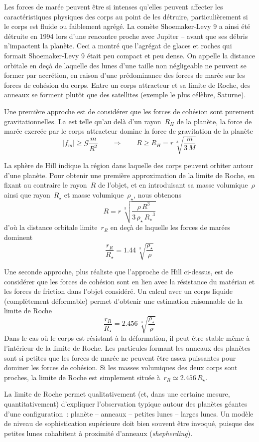 \sk
Les forces de marée peuvent être si intenses qu'elles peuvent affecter les caractéristiques physiques des corps au point de les détruire, particulièrement si le corps est fluide ou faiblement agrégé. La comète Shoemaker-Levy 9 a ainsi été détruite en 1994 lors d'une rencontre proche avec Jupiter -- avant que ses débris n'impactent la planète. Ceci a montré que l'agrégat de glaces et roches qui formait Shoemaker-Levy 9 était peu compact et peu dense. On appelle  la distance orbitale en deçà de laquelle des lunes d'une taille non négligeable ne peuvent se former par accrétion, en raison d'une prédominance des forces de marée sur les forces de cohésion du corps. Entre un corps attracteur et sa limite de Roche, des anneaux se forment plutôt que des satellites (exemple le plus célèbre, Saturne).

\sk
Une première approche est de considérer que les forces de cohésion sont purement gravitationnelles. La  est telle qu'au delà d'un rayon~$R_H$ de la planète, la force de marée exercée par le corps attracteur domine la force de gravitation de la planète
\[ |f_m| \geq \mathcal{G} \frac{m}{R^2} \qquad \Rightarrow \qquad R \geq R_H = r \, \sqrt[3]{ \frac{m}{3\,M} } \]

\sk
La sphère de Hill indique la région dans laquelle des corps peuvent orbiter autour d'une planète. Pour obtenir une première approximation de la limite de Roche, en fixant au contraire le rayon~$R$ de l'objet, et en introduisant sa masse volumique~$\rho$ ainsi que rayon~$R_{\star}$ et masse volumique~$\rho_{\star}$, nous obtenons
\[ R = r \, \sqrt[3]{ \frac{\rho \, R^3}{3\, \rho_{\star} \, {R_{\star}}^3} } \]
d'où la distance orbitale limite~$r_R$ en deçà de laquelle les forces de marées dominent
\[ \frac{r_R}{R_{\star}} = 1.44 \, \sqrt[3]{ \frac{\rho_{\star}}{\rho} } \]

\sk
Une seconde approche, plus réaliste que l'approche de Hill ci-dessus, est de considérer que les forces de cohésion sont en lien avec la résistance du matériau et les forces de friction dans l'objet considéré. Un calcul avec un corps liquide (complètement déformable) permet d'obtenir une estimation raisonnable de la limite de Roche
\[ \frac{r_R}{R_{\star}} = 2.456 \, \sqrt[3]{ \frac{\rho_{\star}}{\rho} } \]
\noindent Dans le cas où le corps est résistant à la déformation, il peut être stable même à l'intérieur de la limite de Roche. Les particules formant les anneaux des planètes sont si petites que les forces de marée ne peuvent être assez puissantes pour dominer les forces de cohésion. Si les masses volumiques des deux corps sont proches, la limite de Roche est simplement située à~$r_R \simeq 2.456 \, R_{\star}$.

\sk
La limite de Roche permet qualitativement (et, dans une certaine mesure, quantitativement) d'expliquer l'observation typique autour des planètes géantes d'une configuration~: planète -- anneaux -- petites lunes -- larges lunes. Un modèle de niveau de sophistication supérieure doit bien souvent être invoqué, puisque des petites lunes cohabitent à proximité d'anneaux (\emph{shepherding}).

